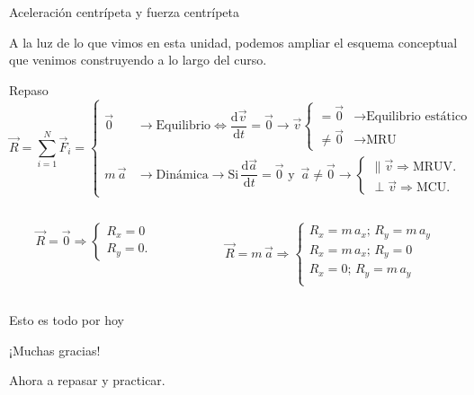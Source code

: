 \documentclass[11pt,handout,aspectratio=1610]{beamer}
\newcommand{\fdiff}[2]{\dfrac{\text{d} #1}{\text{d} #2}}
\newcommand{\vs}{\vspace{11pt}}
\begin{document}
\begin{frame}{Aceleración centrípeta y fuerza centrípeta}

    A la luz de lo que vimos en esta unidad, podemos ampliar el esquema conceptual que venimos construyendo a lo largo del curso.

    \begin{block}{Repaso}
        $$
            \vec{R} = \sum_{i=1}^{N} \vec{F}_i =
            \begin{cases}
                \vec{0} & \rightarrow \text{Equilibrio} \Leftrightarrow  \fdiff{\vec{v}}{t} = \vec{0} \rightarrow \vec{v} \begin{cases}
                    = \vec{0} & \rightarrow \text{Equilibrio estático} \\
                    \neq \vec{0} & \rightarrow \text{MRU} 
                \end{cases} \\
                m \, \vec{a} & \rightarrow \text{Dinámica} \rightarrow \text{Si} \, \fdiff{\vec{a}}{t} = \vec{0} \text{ y } \, \vec{a} \neq \vec{0} \rightarrow \begin{cases}
                    \parallel \vec{v} \Rightarrow \text{MRUV}. \\
                    \perp \vec{v} \Rightarrow \text{MCU}.
                \end{cases}
            \end{cases}
        $$
        \begin{columns}
            \begin{column}{0.5\textwidth}
                $$
                \vec{R} = \vec{0} \Rightarrow 
                \begin{cases}
                    R_x = 0 \\
                    R_y = 0.
                \end{cases}
                $$
            \end{column}
            \begin{column}{0.5\textwidth}
                $$
                    \vec{R} = m \, \vec{a} \Rightarrow 
                    \begin{cases}
                        R_x = m \, a_x; \, R_y = m \, a_y \\
                        R_x = m \, a_x; \, R_y = 0 \\
                        R_x = 0; \, R_y = m \, a_y \\
                    \end{cases}
                $$
            \end{column}
        \end{columns}
    \end{block}

\end{frame}

\begin{frame}{Esto es todo por hoy}

    \begin{center}
        {\huge ¡Muchas gracias!}

        \vs

        Ahora a repasar y practicar.
    \end{center}

\end{frame}
\end{document}

